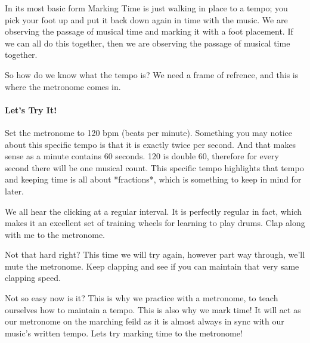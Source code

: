 \documentclass[12pt,letterpaper]{book}
\begin{document}
In its most basic form Marking Time is just walking in place to a tempo; you pick your foot up and put it back down again in time with the music.  We are observing the passage of musical time and marking it with a foot placement.  If we can all do this together, then we are observing the passage of musical time together.  

So how do we know what the tempo is?  We need a frame of refrence, and this is where the metronome comes in.

\paragraph{Let's Try It!}

Set the metronome to 120 bpm (beats per minute).  Something you may notice about this specific tempo is that it is exactly twice per second.  And that makes sense as a minute contains 60 seconds.  120 is double 60, therefore for every second there will be one musical count.  This specific tempo highlights that tempo and keeping time is all about *fractions*, which is something to keep in mind for later.

We all hear the clicking at a regular interval.  It is perfectly regular in fact, which makes it an excellent set of training wheels for learning to play drums.  Clap along with me to the metronome.


Not that hard right?  This time we will try again, however part way through, we'll mute the metronome.  Keep clapping and see if you can maintain that very same clapping speed.  


Not so easy now is it?  This is why we practice with a metronome, to teach ourselves how to maintain a tempo.  This is also why we mark time!  It will act as our metronome on the marching feild as it is almost always in sync with our music's written tempo.  Lets try marking time to the metronome!

\end{document}
